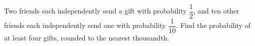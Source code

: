 Two friends each independently send a gift with probability $\dfrac{1}{2}$, and ten other friends each independently send one with probability $\dfrac{1}{10}$. Find the probability of at least four gifts, rounded to the nearest thousandth.
